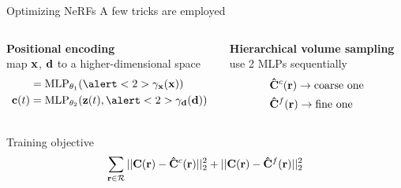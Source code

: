 \documentclass[aspectratio=1610,handout]{beamer}
\begin{document}
\begin{frame}{Optimizing NeRFs}
    A few tricks are employed
    \bigskip
    \pause
    \begin{columns}[t]
        \begin{column}{.42\textwidth}
            \textbf{Positional encoding}\\
            map \(\vb{x}\), \(\vb{d}\) to a higher-dimensional space
            \begin{align*}
                [\sigma(t), \vb{z}(t)] & = \textrm{MLP}_{\theta_1} (\alert<2>{\gamma}_{\vb{x}}(\vb{x})) \\
                \vb{c}(t) & = \textrm{MLP}_{\theta_2} (\vb{z}(t), \alert<2>{\gamma}_{\vb{d}}(\vb{d}))
            \end{align*}
        \end{column}
        \pause
        \begin{column}{.42\textwidth}
            \textbf{Hierarchical volume sampling}\\
            use 2 MLPs sequentially
            \begin{align*}
                &\vb{\hat{C}}^c(\vb{r}) \rightarrow \textrm{coarse one}\\
                &\vb{\hat{C}}^f(\vb{r}) \rightarrow \textrm{fine one}
            \end{align*}
        \end{column}
    \end{columns}
    \bigskip
    \pause
    \begin{block}{Training objective}
        \begin{equation}
            \sum_{\vb{r} \in \mathcal{R}} ||\vb{C}(\vb{r}) - \vb{\hat{C}}^c(\vb{r})||_2^2 + ||\vb{C}(\vb{r}) - \vb{\hat{C}}^f(\vb{r})||_2^2
        \end{equation}
    \end{block}
\end{frame}
\end{document}
